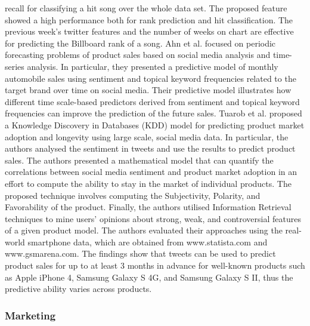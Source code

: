 \documentclass[]{book}
\begin{document}
recall for classifying a hit song over the whole data set. The proposed
feature showed a high performance both for rank prediction and hit
classification. The previous week's twitter features and the number of
weeks on chart are effective for predicting the Billboard rank of a
song. Ahn et al. \citep{ahn2014sales} focused on periodic forecasting
problems of product sales based on social media analysis and time-series
analysis. In particular, they presented a predictive model of monthly
automobile sales using sentiment and topical keyword frequencies related
to the target brand over time on social media. Their predictive model
illustrates how different time scale-based predictors derived from
sentiment and topical keyword frequencies can improve the prediction of
the future sales. Tuarob et al. \citep{tuarob2013fad} proposed a
Knowledge Discovery in Databases (KDD) model for predicting product
market adoption and longevity using large scale, social media data. In
particular, the authors analysed the sentiment in tweets and use the
results to predict product sales. The authors presented a mathematical
model that can quantify the correlations between social media sentiment
and product market adoption in an effort to compute the ability to stay
in the market of individual products. The proposed technique involves
computing the Subjectivity, Polarity, and Favorability of the product.
Finally, the authors utilised Information Retrieval techniques to mine
users' opinions about strong, weak, and controversial features of a
given product model. The authors evaluated their approaches using the
real-world smartphone data, which are obtained from www.statista.com and
www.gsmarena.com. The findings show that tweets can be used to predict
product sales for up to at least 3 months in advance for well-known
products such as Apple iPhone 4, Samsung Galaxy S 4G, and Samsung Galaxy
S II, thus the predictive ability varies across products.

\subsubsection{Marketing}\label{marketing}
\end{document}

